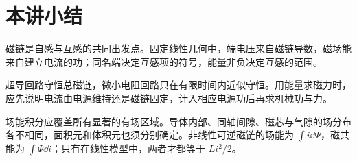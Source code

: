 \section{本讲小结}
磁链是自感与互感的共同出发点。固定线性几何中，端电压来自磁链导数，磁场能来自建立电流的功；同名端决定互感项的符号，能量非负决定互感的范围。

超导回路守恒总磁链，微小电阻回路只在有限时间内近似守恒。用能量求磁力时，应先说明电流由电源维持还是磁链固定，计入相应电源功后再求机械功与力。

场能积分应覆盖所有显著的有场区域。导体内部、同轴间隙、磁芯与气隙的场分布各不相同，面积元和体积元也须分别确定。非线性可逆磁链的场能为 $\int i\dd\Psi$，磁共能为 $\int\Psi\dd i$；只有在线性模型中，两者才都等于 $Li^2/2$。
